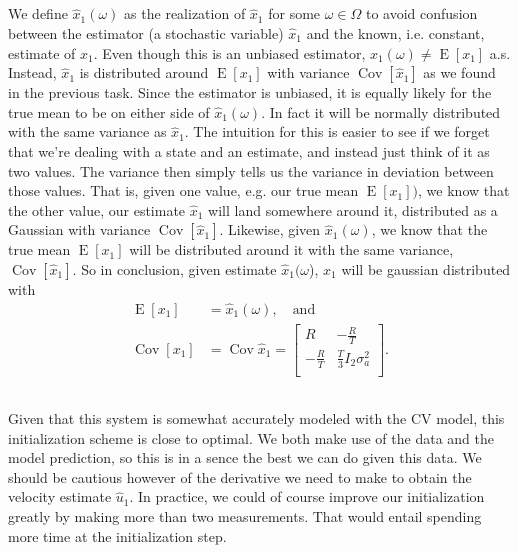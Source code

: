 \documentclass[]{article}
\DeclareMathOperator{\Cov}{\text{Cov}}
\DeclareMathOperator{\E}{\text{E}}
\begin{document}
\subsection{}
We define $\hat x_1 (\omega) $ as the realization of $\hat x_1$ for some $\omega \in \Omega$ to avoid confusion between the estimator (a stochastic variable) $\hat x_1$ and the known, i.e. constant, estimate of $x_1$. Even though this is an unbiased estimator, $\hat x_1(\omega) \neq \E[x_1]$ a.s. Instead, $\hat x_1$ is distributed around $\E[x_1]$ with variance $\Cov[\hat x_1]$ as we found in the previous task. Since the estimator is unbiased, it is equally likely for the true mean to be on either side of $\hat x_1 (\omega)$. In fact it will be normally distributed with the same variance as $\hat x_1$. The intuition for this is easier to see if we forget that we're dealing with a state and an estimate, and instead just think of it as two values. The variance then simply tells us the variance in deviation between those values. That is, given one value, e.g. our true mean $\E[x_1])$, we know that the other value, our estimate $\hat x_1$ will land somewhere around it, distributed as a Gaussian with variance $\Cov[\hat x_1]$. Likewise, given $\hat x_1(\omega)$, we know that the true mean $\E[x_1]$ will be distributed around it with the same variance, $\Cov[\hat x_1]$. So in conclusion, given estimate $\hat x_1(\omega$), $x_1$ will be gaussian distributed with
\begin{align}
\E[x_1] &= \hat x_1(\omega), \quad \text{and} \\
\Cov[x_1] &= \Cov{\hat x_1} =
\begin{bmatrix}
R & -\frac{R}{T} \\
-\frac{R}{T} & \frac{T}{3}I_2 \sigma_a^2 \\
\end{bmatrix}.
\end{align}

\subsection{}
Given that this system is somewhat accurately modeled with the CV model, this initialization scheme is close to optimal. We both make use of the data and the model prediction, so this is in a sence the best we can do given this data. We should be cautious however of the derivative we need to make to obtain the velocity estimate $\hat u_1$. In practice, we could of course improve our initialization greatly by making more than two measurements. That would entail spending more time at the initialization step.
\end{document}
